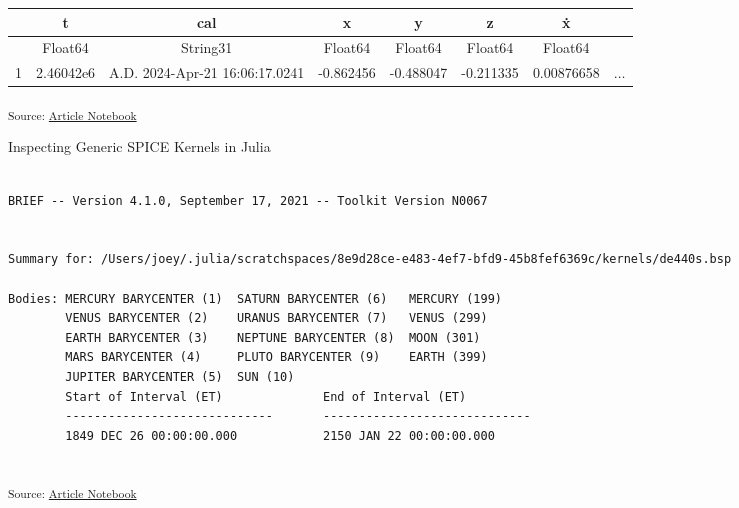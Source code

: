\documentclass[
]{article}
\begin{document}
\begin{tabular}{r|ccccccc}
    & t & cal & x & y & z & ẋ & \\
    \hline
    & Float64 & String31 & Float64 & Float64 & Float64 & Float64 & \\
    \hline
    1 & 2.46042e6 &  A.D. 2024-Apr-21 16:06:17.0241 & -0.862456 & -0.488047 & -0.211335 & 0.00876658 & $\dots$ \\
\end{tabular}

\textsubscript{Source:
\href{https://cadojo.github.io/ephemeris.loopy.codes/index.qmd.html}{Article
Notebook}}

\begin{codelisting}

\caption{\label{lst-spice-inspection}Inspecting Generic SPICE Kernels in
Julia}


\end{codelisting}%

\begin{verbatim}
 
BRIEF -- Version 4.1.0, September 17, 2021 -- Toolkit Version N0067
 
 
Summary for: /Users/joey/.julia/scratchspaces/8e9d28ce-e483-4ef7-bfd9-45b8fef6369c/kernels/de440s.bsp
 
Bodies: MERCURY BARYCENTER (1)  SATURN BARYCENTER (6)   MERCURY (199)
        VENUS BARYCENTER (2)    URANUS BARYCENTER (7)   VENUS (299)
        EARTH BARYCENTER (3)    NEPTUNE BARYCENTER (8)  MOON (301)
        MARS BARYCENTER (4)     PLUTO BARYCENTER (9)    EARTH (399)
        JUPITER BARYCENTER (5)  SUN (10)
        Start of Interval (ET)              End of Interval (ET)
        -----------------------------       -----------------------------
        1849 DEC 26 00:00:00.000            2150 JAN 22 00:00:00.000
 
\end{verbatim}

\textsubscript{Source:
\href{https://cadojo.github.io/ephemeris.loopy.codes/index.qmd.html}{Article
Notebook}}
\end{document}
